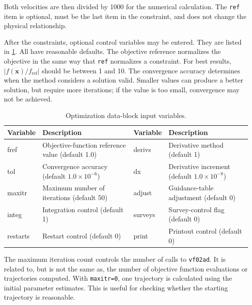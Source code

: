 Both velocities are then divided by 1000 for the numerical calculation.  The
\texttt{ref} item is optional, must be the last item in the constraint, and does not
change the physical relationship.


After the constraints, optional control variables may be entered.  They are listed in
\cref{tab:optimization-control-variables}.  All have reasonable defaults.
The objective reference  normalizes the objective in the same way that
\texttt{ref} normalizes a constraint.  For best results,
$|f(\boldsymbol{x})/f_{\mathrm{ref}}|$ should be between 1 and 10.  The convergence
accuracy  determines when the method considers a solution valid.
Smaller values can produce a better solution, but require more iterations; if the
value is too small, convergence may not be achieved.

\begin{table}[htbp]
  \centering
  \caption{Optimization data-block input variables.}
  \label{tab:optimization-control-variables}
  \small
  \begin{tabularx}{0.98\linewidth}{@{}>{\ttfamily}lX>{\ttfamily}lX@{}}
    \toprule
    \normalfont Variable & Description & \normalfont Variable & Description \\
    \midrule
    fref & Objective-function reference value (default 1.0) &
    derivs & Derivative method (default 1) \\
    tol & Convergence accuracy (default $1.0\times10^{-6}$) &
    dx & Derivative increment (default $1.0\times10^{-8}$) \\
    maxitr & Maximum number of iterations (default 50) &
    adjust & Guidance-table adjustment (default 0) \\
    integ & Integration control (default 1) &
    surveys & Survey-control flag (default 0) \\
    restarts & Restart control (default 0) &
    print & Printout control (default 0) \\
    \bottomrule
  \end{tabularx}
\end{table}

The maximum iteration count  controls the number of calls to
\texttt{vf02ad}.  It is related to, but is not the same as, the number of objective
function evaluations or trajectories computed.  With \texttt{maxitr=0}, one
trajectory is calculated using the initial parameter estimates.  This is useful for
checking whether the starting trajectory is reasonable.

